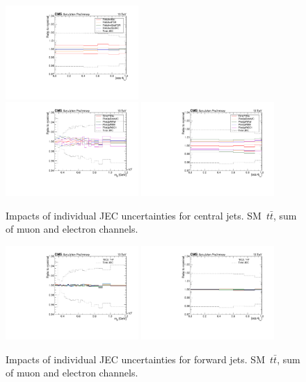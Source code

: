 \begin{figure}
  \includegraphics[width=0.45\textwidth]{fig/chapt7/syst/JEC/CosTopLepTT_3.pdf} \\
  \includegraphics[width=0.45\textwidth]{fig/chapt7/syst/JEC/MassTT_4.pdf}
  \includegraphics[width=0.45\textwidth]{fig/chapt7/syst/JEC/CosTopLepTT_4.pdf}
  \caption{Impacts of individual JEC uncertainties for central jets. SM~$t\bar t$, sum of muon and electron channels.}
  \label{Fig:SystJEC}
\end{figure}

\begin{figure}
  \centering
  \includegraphics[width=0.45\textwidth]{fig/chapt7/syst/JEC/MassTT_fwd.pdf}
  \includegraphics[width=0.45\textwidth]{fig/chapt7/syst/JEC/CosTopLepTT_fwd.pdf}
  \caption{Impacts of individual JEC uncertainties for forward jets. SM~$t\bar t$, sum of muon and electron channels.}
  \label{Fig:SystJECFwd}
\end{figure}

